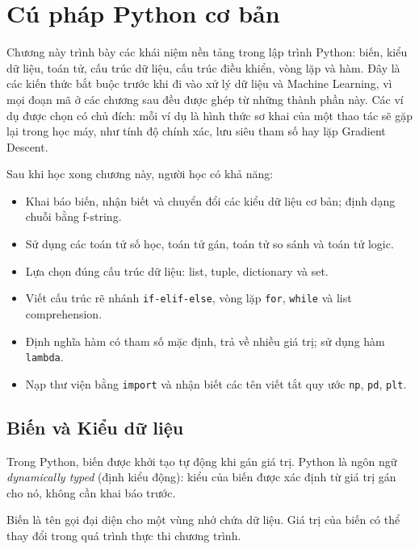 \chapter{Cú pháp Python cơ bản}
\label{chap:python-basics}

Chương này trình bày các khái niệm nền tảng trong lập trình Python: biến, kiểu dữ liệu, toán tử, cấu trúc dữ liệu, cấu trúc điều khiển, vòng lặp và hàm. Đây là các kiến thức bắt buộc trước khi đi vào xử lý dữ liệu và Machine Learning, vì mọi đoạn mã ở các chương sau đều được ghép từ những thành phần này. Các ví dụ được chọn có chủ đích: mỗi ví dụ là hình thức sơ khai của một thao tác sẽ gặp lại trong học máy, như tính độ chính xác, lưu siêu tham số hay lặp Gradient Descent.

\noindent Sau khi học xong chương này, người học có khả năng:
\begin{itemize}
    \item Khai báo biến, nhận biết và chuyển đổi các kiểu dữ liệu cơ bản; định dạng chuỗi bằng f-string.
    \item Sử dụng các toán tử số học, toán tử gán, toán tử so sánh và toán tử logic.
    \item Lựa chọn đúng cấu trúc dữ liệu: list, tuple, dictionary và set.
    \item Viết cấu trúc rẽ nhánh \texttt{if-elif-else}, vòng lặp \texttt{for}, \texttt{while} và list comprehension.
    \item Định nghĩa hàm có tham số mặc định, trả về nhiều giá trị; sử dụng hàm \texttt{lambda}.
    \item Nạp thư viện bằng \texttt{import} và nhận biết các tên viết tắt quy ước \texttt{np}, \texttt{pd}, \texttt{plt}.
\end{itemize}

\section{Biến và Kiểu dữ liệu}

Trong Python, biến được khởi tạo tự động khi gán giá trị. Python là ngôn ngữ \textit{dynamically typed} (định kiểu động): kiểu của biến được xác định từ giá trị gán cho nó, không cần khai báo trước.

\begin{definition}
Biến là tên gọi đại diện cho một vùng nhớ chứa dữ liệu. Giá trị của biến có thể thay đổi trong quá trình thực thi chương trình.
\end{definition}

